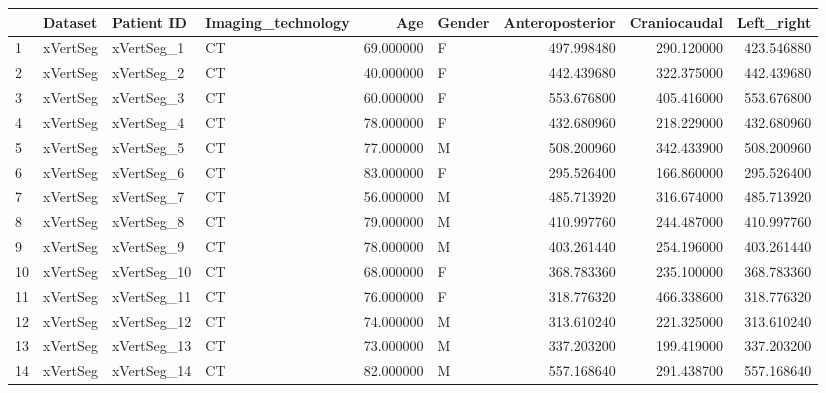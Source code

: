 \begin{tabular}{llllrlrrr}
\toprule
{} &         Dataset &   Patient ID & Imaging\_technology &        Age &   Gender &  Anteroposterior &  Craniocaudal &  Left\_right \\
\midrule
1      &        xVertSeg &   xVertSeg\_1 &                 CT &  69.000000 &        F &       497.998480 &    290.120000 &  423.546880 \\
2      &        xVertSeg &   xVertSeg\_2 &                 CT &  40.000000 &        F &       442.439680 &    322.375000 &  442.439680 \\
3      &        xVertSeg &   xVertSeg\_3 &                 CT &  60.000000 &        F &       553.676800 &    405.416000 &  553.676800 \\
4      &        xVertSeg &   xVertSeg\_4 &                 CT &  78.000000 &        F &       432.680960 &    218.229000 &  432.680960 \\
5      &        xVertSeg &   xVertSeg\_5 &                 CT &  77.000000 &        M &       508.200960 &    342.433900 &  508.200960 \\
6      &        xVertSeg &   xVertSeg\_6 &                 CT &  83.000000 &        F &       295.526400 &    166.860000 &  295.526400 \\
7      &        xVertSeg &   xVertSeg\_7 &                 CT &  56.000000 &        M &       485.713920 &    316.674000 &  485.713920 \\
8      &        xVertSeg &   xVertSeg\_8 &                 CT &  79.000000 &        M &       410.997760 &    244.487000 &  410.997760 \\
9      &        xVertSeg &   xVertSeg\_9 &                 CT &  78.000000 &        M &       403.261440 &    254.196000 &  403.261440 \\
10     &        xVertSeg &  xVertSeg\_10 &                 CT &  68.000000 &        F &       368.783360 &    235.100000 &  368.783360 \\
11     &        xVertSeg &  xVertSeg\_11 &                 CT &  76.000000 &        F &       318.776320 &    466.338600 &  318.776320 \\
12     &        xVertSeg &  xVertSeg\_12 &                 CT &  74.000000 &        M &       313.610240 &    221.325000 &  313.610240 \\
13     &        xVertSeg &  xVertSeg\_13 &                 CT &  73.000000 &        M &       337.203200 &    199.419000 &  337.203200 \\
14     &        xVertSeg &  xVertSeg\_14 &                 CT &  82.000000 &        M &       557.168640 &    291.438700 &  557.168640 \\

\end{tabular}

